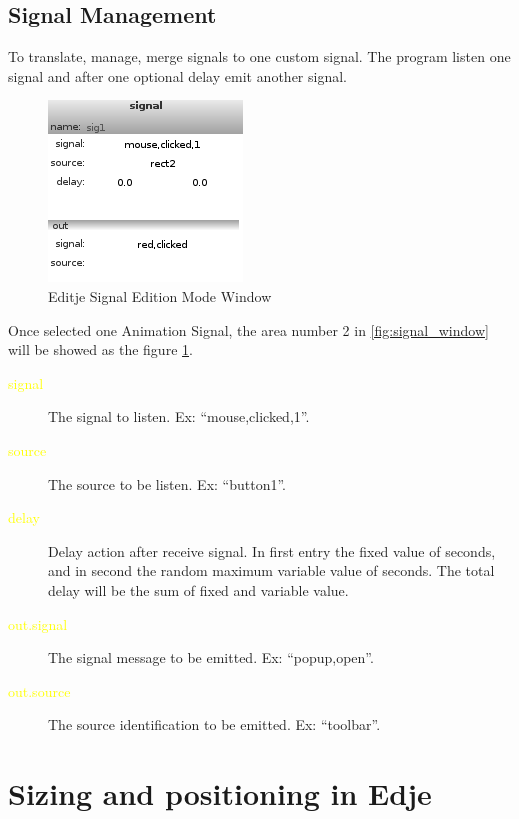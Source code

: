 \documentclass[a4paper]{profusion}
\newcommand{\GUIEditable}[1]{\textcolor{yellow}{#1}} %
\begin{document}
\subsection{Signal Management}
\label{sec:signal_editing_signal}

	To translate, manage, merge signals to one custom signal. The
program listen one signal and after one optional delay emit another signal.

\begin{figure}
 \centering
 \includegraphics{./images/signal_signal.png}
 \caption{Editje Signal Edition Mode Window}
 \label{fig:signal_signal_edition}
\end{figure}

	Once selected one Animation Signal, the area number 2 in
\ref{fig:signal_window} will be showed as the figure
\ref{fig:signal_signal_edition}.

\begin{description}
 \item[\GUIEditable{signal}] The signal to listen. Ex:
   ``mouse,clicked,1''.
 \item[\GUIEditable{source}] The source to be listen. Ex: ``button1''.
 \item[\GUIEditable{delay}] Delay action after receive signal. In
   first entry the fixed value of seconds, and in second the random
   maximum variable value of seconds.  The total delay will be the sum
   of fixed and variable value.
 \item[\GUIEditable{out.signal}] The signal message to be emitted. Ex:
   ``popup,open''.
 \item[\GUIEditable{out.source}] The source identification to be
   emitted. Ex: ``toolbar''.
\end{description}

\newpage
\appendix
\section{Sizing and positioning in Edje}
\label{app:edje_pos}
\end{document}
